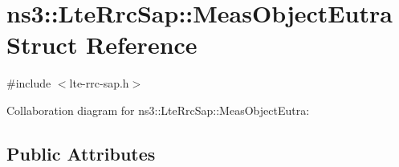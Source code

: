 \hypertarget{structns3_1_1LteRrcSap_1_1MeasObjectEutra}{}\section{ns3\+:\+:Lte\+Rrc\+Sap\+:\+:Meas\+Object\+Eutra Struct Reference}
\label{structns3_1_1LteRrcSap_1_1MeasObjectEutra}


{\ttfamily \#include $<$lte-\/rrc-\/sap.\+h$>$}



Collaboration diagram for ns3\+:\+:Lte\+Rrc\+Sap\+:\+:Meas\+Object\+Eutra\+:
\subsection*{Public Attributes}
